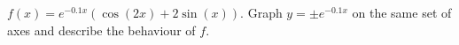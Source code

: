 {$f(x) = e^{-0.1x} \left( \cos(2x) + 2\sin(x)\right)$.  Graph $y = \pm e^{-0.1x}$ on the same set of axes and  describe the behaviour of $f$.}
{}
